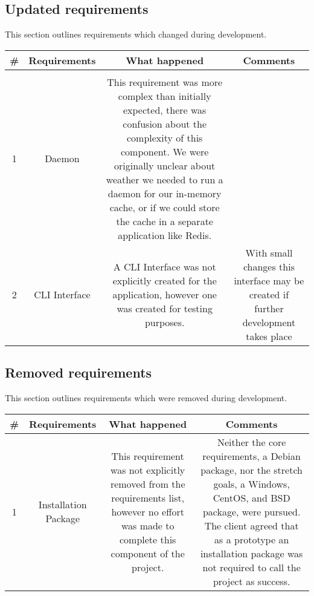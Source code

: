 \subsection{Updated requirements}

This section outlines requirements which changed during development.

\begin{center}
  \begin{tabular}{ c | c | c | c }
    \# & Requirements & What happened & Comments \\
    \hline \\
    1 & Daemon & This requirement was more complex than initially expected, there was confusion about the complexity of this component. We were originally unclear about weather we needed to run a daemon for our in-memory cache, or if we could store the cache in a separate application like Redis. & \\ \hline
    2 & CLI Interface & A CLI Interface was not explicitly created for the application, however one was created for testing purposes. & With small changes this interface may be created if further development takes place \\ \hline
  \end{tabular}
\end{center}

\subsection{Removed requirements}

This section outlines requirements which were removed during development.

\begin{center}
  \begin{tabular}{ c | c | c | c }
    \hline
    \# & Requirements & What happened & Comments \\ \hline
    1 & Installation Package &
      This requirement was not explicitly removed from the requirements list, however no effort was made to complete this component of the project. & 
      Neither the core requirements, a Debian package, nor the stretch goals, a Windows, CentOS, and BSD package, were pursued.
      The client agreed that as a prototype an installation package was not required to call the project as success. \\ \hline
  \end{tabular}
\end{center}
